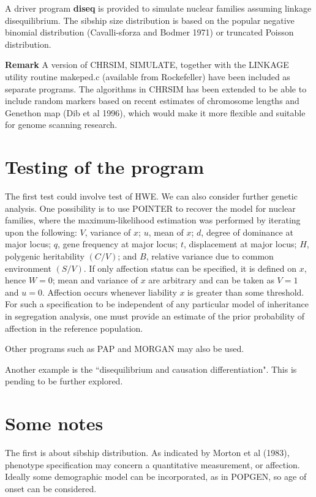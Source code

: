 \documentclass[12pt]{article}
\begin{document}
A driver program {\bf diseq} is provided to simulate nuclear families assuming
linkage disequilibrium. The sibship size distribution is based on the popular negative binomial
distribution (Cavalli-sforza and Bodmer 1971) or truncated Poisson distribution.

{\bf Remark} A version of CHRSIM, SIMULATE, together with the LINKAGE utility routine makeped.c
(available from Rockefeller) have been included as separate programs. 
The algorithms in CHRSIM has been extended to be able to include random markers based on 
recent estimates of chromosome lengths and Genethon map (Dib et al 1996), which would make 
it more flexible and suitable for genome scanning research.


\section{Testing of the program}

The first test could involve test of HWE. We can also consider further genetic analysis. 
One possibility is to use POINTER to recover the model for nuclear families, where the
maximum-likelihood estimation was performed by iterating upon the following: $V$,
variance of $x$; $u$, mean of $x$; $d$, degree of dominance at major locus; $q$, gene
frequency at major locus; $t$, displacement at major locus; $H$, polygenic heritability
$(C/V)$; and $B$, relative variance due to common environment $(S/V)$. If only affection
status can be specified, it is defined on $x$, hence $W=0$;  mean and variance of $x$ are
arbitrary and can be taken as $V=1$ and $u=0$. Affection occurs whenever liability $x$ is
greater than some threshold. For such a specification to be independent of any particular
model of inheritance in segregation analysis, one must provide an estimate of the prior
probability of affection in the reference population.

Other programs such as PAP and MORGAN may also be used.

Another example is the ``disequilibrium and causation differentiation".  This is pending 
to be further explored.

\section{Some notes}

The first is about sibship distribution.  As indicated by Morton et al (1983), phenotype
specification may concern a quantitative measurement, or affection. Ideally some
demographic model can be incorporated, as in POPGEN, so age of onset can be considered. 
\end{document}
